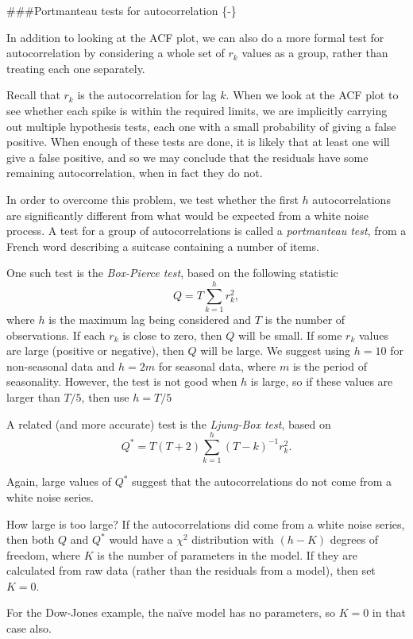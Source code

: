 \documentclass[]{book}
\begin{document}
\#\#\#Portmanteau tests for autocorrelation \{-\}

In addition to looking at the ACF plot, we can also do a more formal test for autocorrelation by considering a whole set of \(r_k\) values as a group, rather than treating each one separately.

Recall that \(r_k\) is the autocorrelation for lag \(k\). When we look at the ACF plot to see whether each spike is within the required limits, we are implicitly carrying out multiple hypothesis tests, each one with a small probability of giving a false positive. When enough of these tests are done, it is likely that at least one will give a false positive, and so we may conclude that the residuals have some remaining autocorrelation, when in fact they do not.

In order to overcome this problem, we test whether the first \(h\) autocorrelations are significantly different from what would be expected from a white noise process. A test for a group of autocorrelations is called a \emph{portmanteau test}, from a French word describing a suitcase containing a number of items.

One such test is the \emph{Box-Pierce test}, based on the following statistic
\[
  Q = T \sum_{k=1}^h r_k^2,
\]
where \(h\) is the maximum lag being considered and \(T\) is the number of observations. If each \(r_k\) is close to zero, then \(Q\) will be small. If some \(r_k\) values are large (positive or negative), then \(Q\) will be large. We suggest using \(h=10\) for non-seasonal data and \(h=2m\) for seasonal data, where \(m\) is the period of seasonality. However, the test is not good when \(h\) is large, so if these values are larger than \(T/5\), then use \(h=T/5\)

A related (and more accurate) test is the \emph{Ljung-Box test}, based on
\[
  Q^* = T(T+2) \sum_{k=1}^h (T-k)^{-1}r_k^2.
\]

Again, large values of \(Q^*\) suggest that the autocorrelations do not come from a white noise series.

How large is too large? If the autocorrelations did come from a white noise series, then both \(Q\) and \(Q^*\) would have a \(\chi^2\) distribution with \((h - K)\) degrees of freedom, where \(K\) is the number of parameters in the model. If they are calculated from raw data (rather than the residuals from a model), then set \(K=0\).

For the Dow-Jones example, the naïve model has no parameters, so \(K=0\) in that case also.
\end{document}
